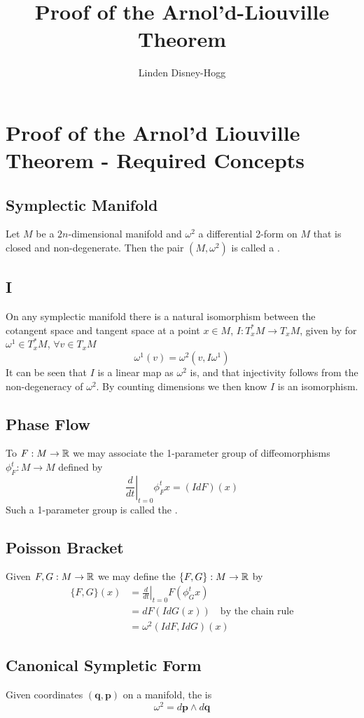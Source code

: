 \documentclass{article}
\title{Proof of the Arnol'd-Liouville Theorem}
\author{Linden Disney-Hogg}
\begin{document}
\section*{Proof of the Arnol'd Liouville Theorem - Required Concepts}
\subsection*{Symplectic Manifold}
Let $M$ be a $2n$-dimensional manifold and $\omega^2$ a differential 2-form on $M$ that is closed and non-degenerate. Then the pair $(M,\omega^2)$ is called a . 


\subsection*{I}
On any symplectic manifold there is a natural isomorphism between the cotangent space and tangent space at a point $x\in M$, $I : T_x^\ast M \to T_x M $, given by for $\omega^1 \in T_x^\ast M$, $\forall v\in T_xM$
\[
\omega^1(v) = \omega^2(v,I\omega^1)
\]
It can be seen that $I$ is a linear map as $\omega^2$ is, and that injectivity follows from the non-degeneracy of $\omega^2$. By counting dimensions we then know $I$ is an isomorphism.


\subsection*{Phase Flow} 
To $F:M\to \mathbb{R}$ we may associate the 1-parameter group of diffeomorphisms $\phi_F^t : M \to M$ defined by 
\[
\left. \frac{d}{dt} \right\rvert_{t=0} \phi_F^t x = (IdF)(x)
\]
Such a 1-parameter group is called the .

\subsection*{Poisson Bracket}
Given $F,G : M \to \mathbb{R}$ we may define the  $\{ F, G \} : M \to \mathbb{R}$ by \begin{align*}
    \{ F, G \}(x) &= \left. \frac{d}{dt} \right\rvert_{t=0} F(\phi_G^t x) \\
    &= dF(IdG(x)) \quad \text{by the chain rule} \\
    &= \omega^2(IdF,IdG)(x)
\end{align*}

\subsection*{Canonical Sympletic Form}
Given coordinates $(\bm{q},\bm{p})$ on a manifold, the  is 
\[
\omega^2 = d\bm{p} \wedge d\bm{q}
\]
 
\end{document}
